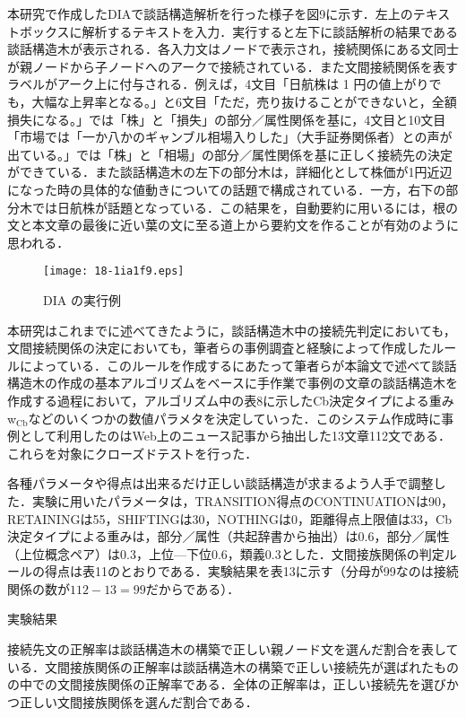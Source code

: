 \documentclass[japanese]{jnlp_1.4}
\begin{document}
本研究で作成したDIAで談話構造解析を行った様子を図9に示す．左上のテキストボックスに解析するテキストを入力．実行すると左下に談話解析の結果である談話構造木が表示される．各入力文はノードで表示され，接続関係にある文同士が親ノードから子ノードへのアークで接続されている．また文間接続関係を表すラベルがアーク上に付与される．例えば，4文目「日航株は 1 円の値上がりでも，大幅な上昇率となる。」と6文目「ただ，売り抜けることができないと，全額損失になる。」では「株」と「損失」の部分／属性関係を基に，4文目と10文目「市場では「一か八かのギャンブル相場入りした」（大手証券関係者）との声が出ている。」では「株」と「相場」の部分／属性関係を基に正しく接続先の決定ができている．また談話構造木の左下の部分木は，詳細化として株価が1円近辺になった時の具体的な値動きについての話題で構成されている．一方，右下の部分木では日航株が話題となっている．この結果を，自動要約に用いるには，根の文と本文章の最後に近い葉の文に至る道上から要約文を作ることが有効のように思われる．

\begin{figure}[b]
\begin{center}
\texttt{[image: 18-1ia1f9.eps]}
\end{center}
\caption{DIA の実行例}
\end{figure}

本研究はこれまでに述べてきたように，談話構造木中の接続先判定においても，文間接続関係の決定においても，筆者らの事例調査と経験によって作成したルールによっている．このルールを作成するにあたって筆者らが本論文で述べて談話構造木の作成の基本アルゴリズムをベースに手作業で事例の文章の談話構造木を作成する過程において，アルゴリズム中の表8に示したCb決定タイプによる重み w$_\mathrm{Cb}$などのいくつかの数値パラメタを決定していった．このシステム作成時に事例として利用したのはWeb上のニュース記事から抽出した13文章112文である．これらを対象にクローズドテストを行った．

各種パラメータや得点は出来るだけ正しい談話構造が求まるよう人手で調整した．実験に用いたパラメータは，TRANSITION得点のCONTINUATIONは90，RETAININGは55，SHIFTINGは30，NOTHINGは0，距離得点上限値は33，Cb決定タイプによる重みは，部分／属性（共起辞書から抽出）は0.6，部分／属性（上位概念ペア）は0.3，上位—下位0.6，類義0.3とした．文間接族関係の判定ルールの得点は表11のとおりである．実験結果を表13に示す（分母が99なのは接続関係の数が$112-13=99$だからである）．

\begin{table}[b]
\caption{実験結果}

\end{table}

接続先文の正解率は談話構造木の構築で正しい親ノード文を選んだ割合を表している．文間接族関係の正解率は談話構造木の構築で正しい接続先が選ばれたものの中での文間接族関係の正解率である．全体の正解率は，正しい接続先を選びかつ正しい文間接族関係を選んだ割合である．
\end{document}
